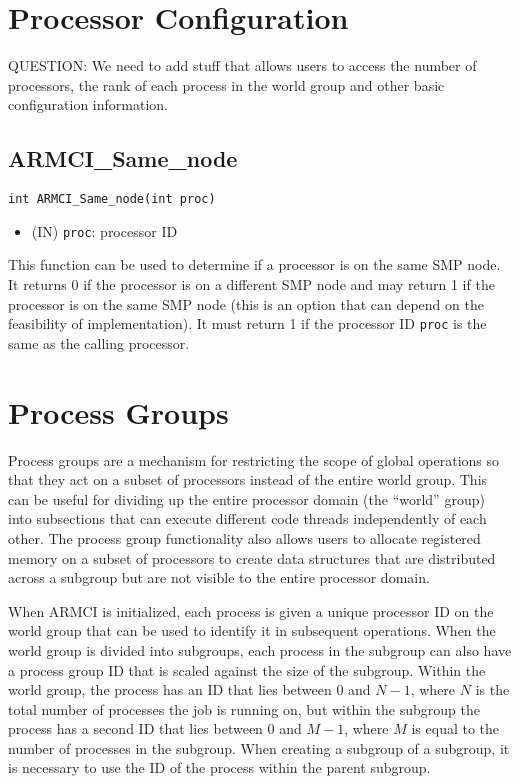 \documentclass[12pt]{article}
\begin{document}
\section{Processor Configuration}
QUESTION: We need to add stuff that allows users to access the number of
processors, the rank of each process in the world group and other basic
configuration information.

\subsection{ARMCI\_Same\_node}
\begin{verbatim}
int ARMCI_Same_node(int proc)
\end{verbatim}
\begin{itemize}
\item (IN) \texttt{proc}: processor ID
\end{itemize}
This function can be used to determine if a processor is on the same SMP node.
It returns 0 if the processor is on a different SMP node and may return 1 if the
processor is on the same SMP node (this is an option that can depend on the
feasibility of implementation). It must return 1 if the processor ID
\texttt{proc} is the same as the calling processor.

\section{Process Groups}
Process groups are a mechanism for restricting the scope of global operations so
that they act on a subset of processors instead of the entire world group. This
can be useful for dividing up the entire processor domain (the ``world'' group)
into subsections that can execute different code threads independently of each
other. The process group functionality also allows users to allocate registered
memory on a subset of processors to create data structures that are distributed
across a subgroup but are not visible to the entire processor domain.

When ARMCI is initialized, each process is given a unique processor ID on the
world group that can be used to identify it in subsequent operations. When the
world group is divided into subgroups, each process in the subgroup can also
have a process group ID that is scaled against the size of the subgroup. Within
the world group, the process has an ID that lies between 0 and $N-1$, where $N$
is the total number of processes the job is running on, but within the subgroup
the process has a second ID that lies between 0 and $M-1$, where $M$ is equal to
the number of processes in the subgroup. When creating a subgroup of a subgroup,
it is necessary to use the ID of the process within the parent subgroup.
\end{document}
